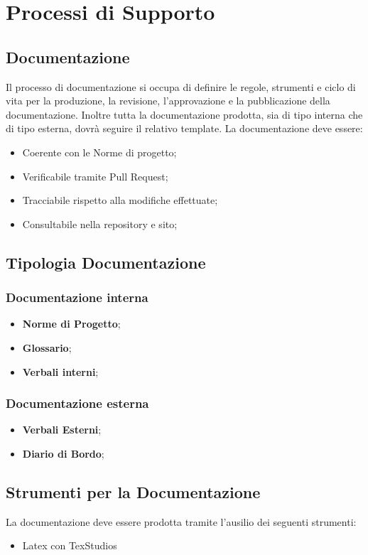 \section{Processi di Supporto}
\subsection{Documentazione}
Il processo di documentazione si occupa di definire le regole, strumenti e ciclo di vita per la produzione, la revisione, l'approvazione e la pubblicazione della documentazione. Inoltre tutta la documentazione prodotta, sia di tipo interna che di tipo esterna, dovrà seguire il relativo template.
La documentazione deve essere:
\begin{itemize}
	\item Coerente con le Norme di progetto;
	\item Verificabile tramite Pull Request;
	\item Tracciabile rispetto alla modifiche effettuate;
	\item Consultabile nella repository e sito;
\end{itemize}
\subsection{Tipologia Documentazione}
\subsubsection{Documentazione interna}
\begin{itemize}
	\item \textbf{Norme di Progetto};
	\item \textbf{Glossario};
	\item \textbf{Verbali interni};
\end{itemize}

\subsubsection{Documentazione esterna}
\begin{itemize}
	\item \textbf{Verbali Esterni};
	\item \textbf{Diario di Bordo};
\end{itemize}

\subsection{Strumenti per la Documentazione}
La documentazione deve essere prodotta tramite l'ausilio dei seguenti strumenti:
\begin{itemize}
	\item Latex con TexStudios 
\end{itemize}

